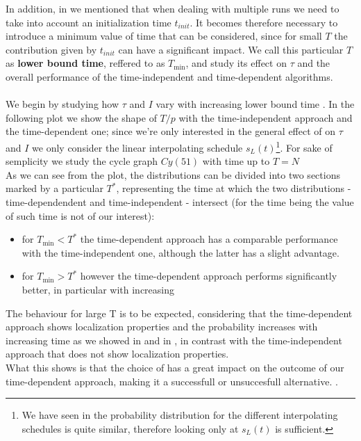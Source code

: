         \noindent
        In addition, in   we mentioned that when dealing with multiple runs we need to take into account an initialization time $t_{init}$. It becomes therefore necessary to introduce a minimum value of time that can be considered, since for small $T$ the contribution given by $t_{init}$ can have a significant impact. We call this particular $T$ as \textbf{lower bound time}, reffered to as $T_{\min}$, and study its effect on $\tau$ and the overall performance of the time-independent and time-dependent algorithms. \\ \\

         We begin by studying how $\tau$ and $I$ vary with increasing lower bound time \tmin.
         In the following plot we show the shape of $T/p$ with the time-independent approach and the time-dependent one; since we're only interested in the general effect of \tmin on $\tau$ and $I$ we only consider the linear interpolating schedule $s_L(t)$\footnote{We have seen in  the probability distribution for the different interpolating schedules is quite similar, therefore looking only at $s_L(t)$ is sufficient.}. For sake of semplicity we study the cycle graph $Cy(51)$ with time up to $T=N$\\
         

        As we can see from the plot, the distributions can be divided into two sections marked by a particular $T^*$, representing the time at which the two distributions - time-dependendent and time-independent - intersect (for the time being the value of such time is not of our interest):
        \begin{itemize}
            \item for $T_{\min}<T^*$ the time-dependent approach has a comparable performance with the time-independent one, although the latter has a slight advantage.
            \item for $T_{\min}>T^*$ however the time-dependent approach performs significantly better, in particular with increasing \tmin
        \end{itemize}
        The behaviour for large T is to be expected, considering that the time-dependent approach shows localization properties and the probability increases with increasing time as we showed in  and in , in contrast with the time-independent approach that does not show localization properties.\\ What this shows is that the choice of \tmin has a great impact on the outcome of our time-dependent approach, making it a successfull or unsuccesfull alternative. .\\

